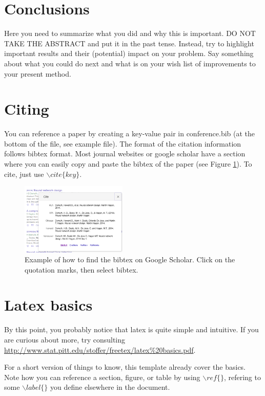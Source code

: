 \documentclass{article}
\begin{document}
\section{Conclusions}
\label{sec:conclusion}

Here you need to summarize what you did and why this is important.  DO
NOT TAKE THE ABSTRACT and put it in the past tense. Instead, try to
highlight important results and their (potential) impact on your
problem. Say something about what you could do next and what is on
your wish list of improvements to your present method.


\section{Citing}
\label{sec:cite}

You can reference a paper by creating a key-value pair in conference.bib (at the bottom of the file, see example file). The format of the citation information follows bibtex format. Most journal websites or google scholar have a section where you can easily copy and paste the bibtex of the paper (see Figure \ref{fig:bibtex}). To cite, just use $\backslash cite\{key\}$. 

\begin{figure}
  \centering
  \centerline{\includegraphics[width=0.45\textwidth]{bibtex.png}}
  \caption{Example of how to find the bibtex on Google Scholar. Click on the quotation marks, then select bibtex.}
  \label{fig:bibtex}
\end{figure}

\section{Latex basics}
\label{sec:latex}

By this point, you probably notice that latex is quite simple and intuitive. If you are curious about more, try consulting \url{http://www.stat.pitt.edu/stoffer/freetex/latex%20basics.pdf}.

For a short version of things to know, this template already cover the basics. Note how you can reference a section, figure, or table by using $\backslash ref\{\}$, refering to some $\backslash label\{\}$ you define elsewhere in the document.
\end{document}
